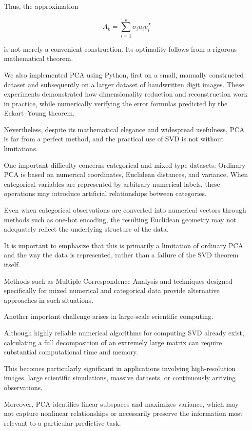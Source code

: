 \documentclass[11pt]{article}
\begin{document}
Thus, the approximation

\[
\boxed{
A_k=\sum_{i=1}^{k}
\sigma_i u_i v_i^T
}
\]

is not merely a convenient construction.
Its optimality follows from a rigorous
mathematical theorem.

We also implemented PCA using Python,
first on a small, manually constructed
dataset and subsequently on a larger
dataset of handwritten digit images.
These experiments demonstrated how
dimensionality reduction and reconstruction
work in practice, while numerically
verifying the error formulas predicted
by the Eckart--Young theorem.

Nevertheless, despite its mathematical
elegance and widespread usefulness,
PCA is far from a perfect method,
and the practical use of SVD is not
without limitations.

One important difficulty concerns
categorical and mixed-type datasets.
Ordinary PCA is based on numerical
coordinates, Euclidean distances,
and variance. When categorical
variables are represented by
arbitrary numerical labels, these
operations may introduce artificial
relationships between categories.

Even when categorical observations
are converted into numerical vectors
through methods such as one-hot
encoding, the resulting Euclidean
geometry may not adequately reflect
the underlying structure of the data.

It is important to emphasize that
this is primarily a limitation of
ordinary PCA and the way the data
is represented, rather than a failure
of the SVD theorem itself.

Methods such as Multiple Correspondence
Analysis and techniques designed
specifically for mixed numerical and
categorical data provide alternative
approaches in such situations.

Another important challenge arises
in large-scale scientific computing.

Although highly reliable numerical
algorithms for computing SVD already
exist, calculating a full decomposition
of an extremely large matrix can
require substantial computational
time and memory.

This becomes particularly significant
in applications involving high-resolution
images, large scientific simulations,
massive datasets, or continuously
arriving observations.

Moreover, PCA identifies linear
subspaces and maximizes variance,
which may not capture nonlinear
relationships or necessarily preserve
the information most relevant to a
particular predictive task.
\end{document}
